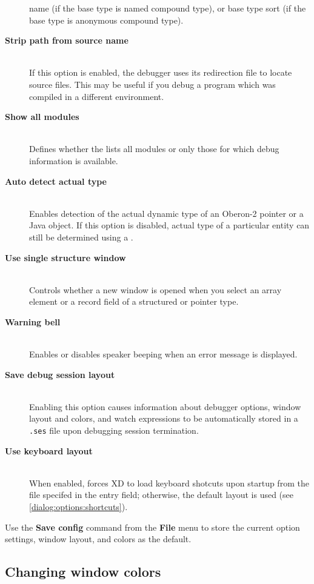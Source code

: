 \begin{description}
    name (if the base type is named compound type), or base type sort
    (if the base type is anonymous compound type).
\item[{\bf Strip path from source name}] \mbox{} \\
    If this option is enabled, the debugger uses its redirection file
    to locate source files. This may be useful if you debug a program which
    was compiled in a different environment.
\item[{\bf Show all modules}] \mbox{} \\
    Defines whether the 
    lists all modules or only those for which debug information is available.
\item[{\bf Auto detect actual type}] \mbox{} \\
    Enables detection of the actual dynamic type of an Oberon-2 pointer 
    or a Java object. If this option is disabled, actual type of a 
    particular entity can still be determined using a
    .
\item[{\bf Use single structure window}] \mbox{} \\
    Controls whether a new window is opened when you select an array element
    or a record field of a structured or pointer type.
\item[{\bf Warning bell}] \mbox{} \\
    Enables or disables speaker beeping when an error message is displayed.
\item[{\bf Save debug session layout}] \mbox{} \\
    Enabling this option causes information about debugger options,
    window layout and colors, and watch expressions to be automatically 
    stored in a \verb'.ses' file upon debugging session termination.
\item[{\bf Use keyboard layout}] \mbox{} \\
    When enabled, forces XD to load keyboard shotcuts upon startup 
    from the file specifed in the entry field; otherwise, the default 
    layout is used (see \ref{dialog:options:shortcuts}).
\end{description}

Use the {\bf Save config} command from the {\bf File} menu to store the
current option settings, window layout, and colors as the default.

\subsection{Changing window colors}
\label{dialog:options:colors}

